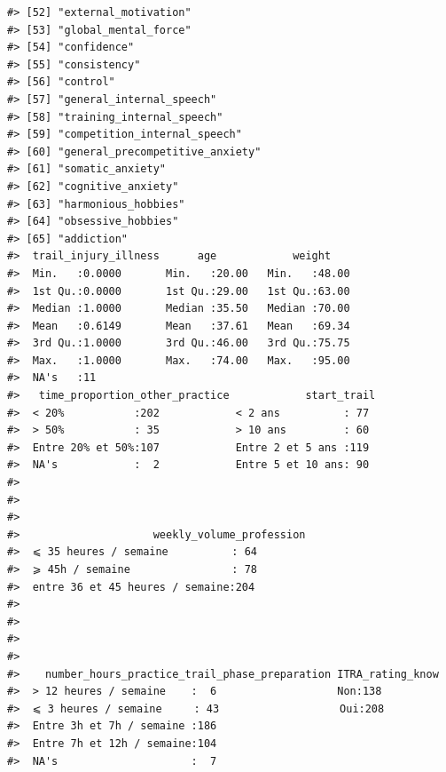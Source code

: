 \documentclass[
]{article}
\begin{document}
\begin{verbatim}
#> [52] "external_motivation"                                     
#> [53] "global_mental_force"                                     
#> [54] "confidence"                                              
#> [55] "consistency"                                             
#> [56] "control"                                                 
#> [57] "general_internal_speech"                                 
#> [58] "training_internal_speech"                                
#> [59] "competition_internal_speech"                             
#> [60] "general_precompetitive_anxiety"                          
#> [61] "somatic_anxiety"                                         
#> [62] "cognitive_anxiety"                                       
#> [63] "harmonious_hobbies"                                      
#> [64] "obsessive_hobbies"                                       
#> [65] "addiction"
#>  trail_injury_illness      age            weight     
#>  Min.   :0.0000       Min.   :20.00   Min.   :48.00  
#>  1st Qu.:0.0000       1st Qu.:29.00   1st Qu.:63.00  
#>  Median :1.0000       Median :35.50   Median :70.00  
#>  Mean   :0.6149       Mean   :37.61   Mean   :69.34  
#>  3rd Qu.:1.0000       3rd Qu.:46.00   3rd Qu.:75.75  
#>  Max.   :1.0000       Max.   :74.00   Max.   :95.00  
#>  NA's   :11                                          
#>   time_proportion_other_practice            start_trail 
#>  < 20%           :202            < 2 ans          : 77  
#>  > 50%           : 35            > 10 ans         : 60  
#>  Entre 20% et 50%:107            Entre 2 et 5 ans :119  
#>  NA's            :  2            Entre 5 et 10 ans: 90  
#>                                                         
#>                                                         
#>                                                         
#>                     weekly_volume_profession
#>  ⩽ 35 heures / semaine          : 64        
#>  ⩾ 45h / semaine                : 78        
#>  entre 36 et 45 heures / semaine:204        
#>                                             
#>                                             
#>                                             
#>                                             
#>    number_hours_practice_trail_phase_preparation ITRA_rating_know
#>  > 12 heures / semaine    :  6                   Non:138         
#>  ⩽ 3 heures / semaine     : 43                   Oui:208         
#>  Entre 3h et 7h / semaine :186                                   
#>  Entre 7h et 12h / semaine:104                                   
#>  NA's                     :  7                                   

\end{verbatim}
\end{document}
